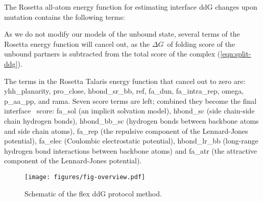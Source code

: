 The Rosetta all-atom energy function for estimating interface ddG changes upon mutation contains the following terms:


As we do not modify our models of the unbound state, several terms of the Rosetta energy function will cancel out, as the $\Delta G$\ of folding score of the unbound partners is subtracted from the total score of the complex (\cref{eqn:split-ddg}).

The terms in the Rosetta Talaris energy function that cancel out to zero are: yhh\_planarity, pro\_close, hbond\_sr\_bb, ref, fa\_dun, fa\_intra\_rep, omega, p\_aa\_pp, and rama.
Seven score terms are left; combined they become the final interface \ddg\ score: fa\_sol (an implicit solvation model\cite{lazaridis_effective_1999}), hbond\_sc (side chain-side chain hydrogen bonds), hbond\_bb\_sc (hydrogen bonds between backbone atoms and side chain atoms), fa\_rep (the repulsive component of the Lennard-Jones potential\cite{lennard-jones_determination_1924}), fa\_elec (Coulombic electrostatic potential), hbond\_lr\_bb (long-range hydrogen bond interactions between backbone atoms) and fa\_atr (the attractive component of the Lennard-Jones potential).


\begin{figure}
  \centering
  \texttt{[image: figures/fig-overview.pdf]}
    \caption[]{
      Schematic of the flex ddG protocol method.
  } \label{fig:figure-overview}
\end{figure}

